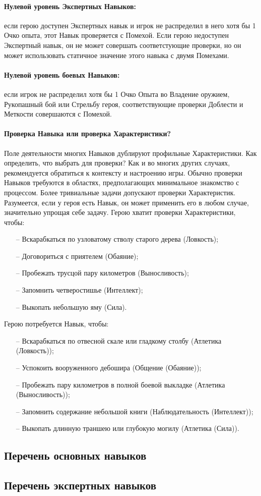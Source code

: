 \paragraph{Нулевой уровень Экспертных Навыков:} если герою доступен Экспертных навык и игрок не распределил в него хотя бы 1 Очко опыта, этот Навык проверяется с Помехой. 
\newline Если герою недоступен Экспертный навык, он не может совершать соответстующие проверки, но он может использовать статичное значение этого навыка с двумя Помехами.
\paragraph{Нулевой уровень боевых Навыков:} если игрок не распределил хотя бы 1 Очко Опыта во Владение оружием, Рукопашный бой или Стрельбу героя, соответствующие проверки Доблести и Меткости совершаются с Помехой.

\paragraph{Проверка Навыка или проверка Характеристики?} Поле деятельности многих Навыков дублируют профильные Характеристики. Как определить, что выбрать для проверки? Как и во многих других случаях, рекомендуется обратиться к контексту и настроению игры. Обычно проверки Навыков требуются в областях, предполагающих минимальное знакомство с процессом. Более тривиальные задачи допускают проверки Характеристик. Разумеется, если у героя есть Навык, он может применить его в любом случае, значительно упрощая себе задачу.
\newline Герою хватит проверки Характеристики, чтобы:
\begin{itemize}
    \item[--] Вскарабкаться по узловатому стволу старого дерева (Ловкость);
    \item[--] Договориться с приятелем (Обаяние);
    \item[--] Пробежать трусцой пару километров (Выносливость);
    \item[--] Запомнить четверостишье (Интеллект);
    \item[--] Выкопать небольшую яму (Сила).
\end{itemize}
Герою потребуется Навык, чтобы:
\begin{itemize}
    \item[--] Вскарабкаться по отвесной скале или гладкому столбу (Атлетика (Ловкость));
    \item[--] Успокоить вооруженного дебошира (Общение (Обаяние));
    \item[--] Пробежать пару километров в полной боевой выкладке (Атлетика (Выносливость));
    \item[--] Запомнить содержание небольшой книги (Наблюдательность (Интеллект));
    \item[--] Выкопать длинную траншею или глубокую могилу (Атлетика (Сила)).
\end{itemize}

\subsection{Перечень основных навыков}

\subsection{Перечень экспертных навыков}
